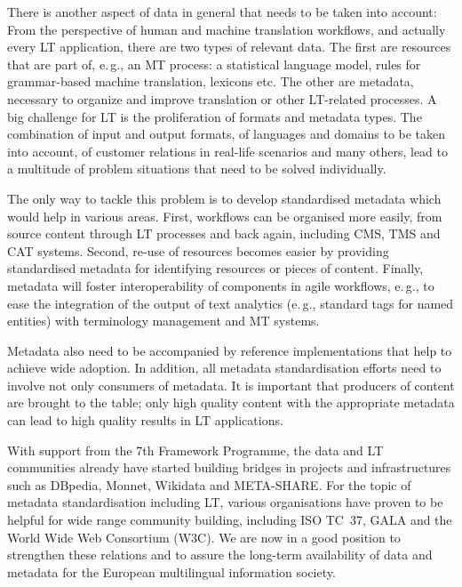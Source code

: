 \documentclass[10pt, plain]{../../metanetpaper}
\begin{document}
\begin{multicols}{2}

There is another aspect of data in general that needs to be taken into account: From the perspective of human and machine translation workflows, and actually every LT application, there are two types of relevant data. The first are resources that are part of, e.\,g., an MT process: a statistical language model, rules for grammar-based machine translation, lexicons etc. The other are metadata, necessary to organize and improve translation or other LT-related processes. A big challenge for LT is the proliferation of formats and metadata types. The combination of input and output formats, of languages and domains to be taken into account, of customer relations in real-life scenarios and many others, lead to a multitude of problem situations that need to be solved individually.

The only way to tackle this problem is to develop standardised metadata which would help in various areas. First, workflows can be organised more easily, from source content through LT processes and back again, including CMS, TMS and CAT systems. Second, re-use of resources becomes easier by providing standardised metadata for identifying resources or pieces of content. Finally, metadata will foster interoperability of components in agile workflows, e.\,g., to ease the integration of the output of text analytics (e.\,g., standard tags for named entities) with terminology management and MT systems.

Metadata also need to be accompanied by reference implementations that help to achieve wide adoption. In addition, all metadata standardisation efforts need to involve not only consumers of metadata. It is important that producers of content are brought to the table; only high quality content with the appropriate metadata can lead to high quality results in LT applications.

With support from the 7th Framework Programme, the data and LT communities already have started building bridges in projects and infrastructures such as DBpedia, Monnet, Wikidata and META-SHARE. For the topic of metadata standardisation including LT, various organisations have proven to be helpful for wide range community building, including ISO TC~37, GALA and the World Wide Web Consortium (W3C). We are now in a good position to strengthen these relations and to assure the long-term availability of data and metadata for the European multilingual information society.


\end{multicols}
\end{document}
